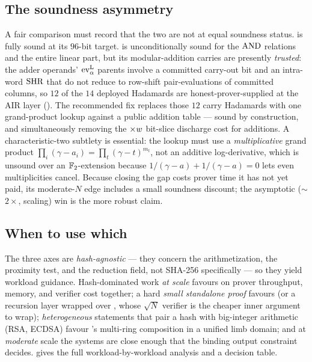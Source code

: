 \subsection{The soundness asymmetry}
\label{sec:cmp-soundness}

A fair comparison must record that the two are not at equal soundness status.
\binius{} is fully sound at its $96$-bit target. \zinc{} is unconditionally
sound for the $\operatorname{AND}$ relations and the entire linear part, but its
modular-addition carries are presently \emph{trusted}: the adder operands'
$\operatorname{ev}^{\mathrm{L}}_{\alpha}$ parents involve a committed carry-out bit and an intra-word $\operatorname{SHR}$ that
do not reduce to row-shift pair-evaluations of committed columns, so $12$ of
the $14$ deployed Hadamards are honest-prover-supplied at the AIR layer
(). The recommended fix replaces those $12$ carry
Hadamards with one grand-product lookup against a public addition table ---
sound by construction, and simultaneously removing the $\times w$ bit-slice
discharge cost for additions. A characteristic-two subtlety is essential: the
lookup must use a \emph{multiplicative} grand product $\prod_i(\gamma-a_i) =
\prod_t(\gamma-t)^{m_t}$, not an additive log-derivative, which is unsound over
an $\mathbb{F}_2$-extension because $1/(\gamma-a)+1/(\gamma-a)=0$ lets even
multiplicities cancel. Because closing the gap costs \zinc{} prover time it has
not yet paid, its moderate-$N$ edge includes a small soundness discount; the
asymptotic ($\sim$$2\times$, scaling) win is the more robust claim.

\subsection{When to use which}
\label{sec:guidance-brief}

The three axes are \emph{hash-agnostic} --- they concern the arithmetization,
the proximity test, and the reduction field, not SHA-256 specifically --- so
they yield workload guidance. Hash-dominated work \emph{at scale} favours
\zinc{} on prover throughput, memory, and verifier cost together; a hard
\emph{small standalone proof} favours \binius{} (or a recursion layer wrapped
over \zinc{}, whose $\sqrt N$ verifier is the cheaper inner argument to wrap);
\emph{heterogeneous} statements that pair a hash with big-integer arithmetic
(RSA, ECDSA) favour \zinc{}'s multi-ring composition in a unified limb domain;
and at \emph{moderate} scale the systems are close enough that the binding
output constraint decides.  gives the full
workload-by-workload analysis and a decision table.


